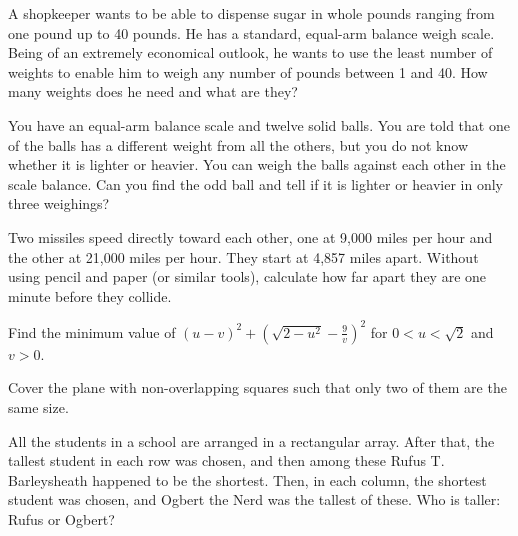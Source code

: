 \documentclass{article}
\begin{document}
\begin{exercise}
A shopkeeper wants to be able to dispense sugar in whole pounds ranging from one pound up to 40 pounds.
He has a standard, equal-arm balance weigh scale.
Being of an extremely economical outlook, he wants to use the least number of weights to enable him to weigh any number of pounds between 1 and 40.
How many weights does he need and what are they?
\end{exercise}

\begin{exercise}
You have an equal-arm balance scale and twelve solid balls. You are told that one of the balls has a different weight from all the others, but you do not know whether it is lighter or heavier. You can weigh the balls against each other in the scale balance. Can you find the odd ball and tell if it is lighter or heavier in only three weighings?
\end{exercise}

\begin{exercise}
Two missiles speed directly toward each other, one at 9,000 miles per hour and the other at 21,000 miles per hour. 
They start at 4,857 miles apart. 
Without using pencil and paper (or similar tools), calculate how far apart they are one minute before they collide.
\end{exercise}

\begin{exercise}
Find the minimum value of $(u-v)^2+(\sqrt{2-u^2}-\frac{9}{v})^2$ for $0<u<\sqrt{2}$ and $v>0$.
\end{exercise}

\begin{exercise}
Cover the plane with non-overlapping squares such that only two of them are the same size.
\end{exercise}

\begin{exercise}
All the students in a school are arranged in a rectangular array. 
After that, the tallest student in each row was chosen, and then among these Rufus T. Barleysheath happened to be the shortest. 
Then, in each column, the shortest student was chosen, and Ogbert the Nerd was the tallest of these. 
Who is taller: Rufus or Ogbert?
\end{exercise}
\end{document}
